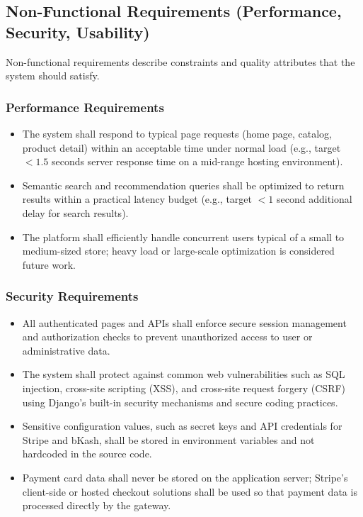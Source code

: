 \subsection{Non-Functional Requirements (Performance, Security, Usability)}
Non-functional requirements describe constraints and quality attributes that the system should satisfy.

\subsubsection*{Performance Requirements}
\begin{itemize}
  \item The system shall respond to typical page requests (home page, catalog, product detail) within an acceptable time under normal load (e.g., target $< 1.5$ seconds server response time on a mid-range hosting environment).
  \item Semantic search and recommendation queries shall be optimized to return results within a practical latency budget (e.g., target $< 1$ second additional delay for search results).
  \item The platform shall efficiently handle concurrent users typical of a small to medium-sized store; heavy load or large-scale optimization is considered future work.
\end{itemize}

\subsubsection*{Security Requirements}
\begin{itemize}
  \item All authenticated pages and APIs shall enforce secure session management and authorization checks to prevent unauthorized access to user or administrative data.
  \item The system shall protect against common web vulnerabilities such as SQL injection, cross-site scripting (XSS), and cross-site request forgery (CSRF) using Django’s built-in security mechanisms and secure coding practices.
  \item Sensitive configuration values, such as secret keys and API credentials for Stripe and bKash, shall be stored in environment variables and not hardcoded in the source code.
  \item Payment card data shall never be stored on the application server; Stripe’s client-side or hosted checkout solutions shall be used so that payment data is processed directly by the gateway.
\end{itemize}

